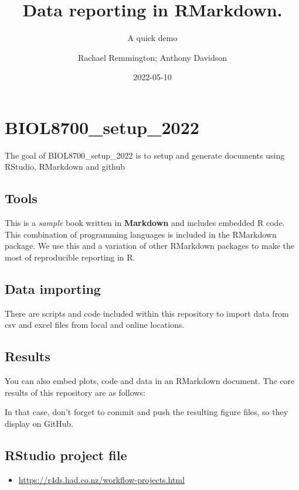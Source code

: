 \documentclass[
]{book}
\title{Data reporting in RMarkdown.}
\subtitle{A quick demo}
\author{Rachael Remmington; Anthony Davidson}
\date{2022-05-10}
\providecommand{\tightlist}{%
  \setlength{\itemsep}{0pt}\setlength{\parskip}{0pt}}
\begin{document}
\maketitle

{
\setcounter{tocdepth}{1}
\tableofcontents
}
\hypertarget{biol8700_setup_2022}{%
\chapter{BIOL8700\_setup\_2022}\label{biol8700_setup_2022}}

The goal of BIOL8700\_setup\_2022 is to setup and generate documents using RStudio, RMarkdown and github

\hypertarget{tools}{%
\section{Tools}\label{tools}}

This is a \emph{sample} book written in \textbf{Markdown} and includes embedded R code. This combination of programming languages is included in the RMarkdown package. We use this and a variation of other RMarkdown packages to make the most of reproducible reporting in R.

\hypertarget{data-importing}{%
\section{Data importing}\label{data-importing}}

There are scripts and code included within this repository to import data from csv and excel files from local and online locations.

\hypertarget{results}{%
\section{Results}\label{results}}

You can also embed plots, code and data in an RMarkdown document. The core results of this repository are as follows:

In that case, don't forget to commit and push the resulting figure files, so they display on GitHub.

\hypertarget{rstudio-project-file}{%
\section{RStudio project file}\label{rstudio-project-file}}

\begin{itemize}
\tightlist
\item
  \url{https://r4ds.had.co.nz/workflow-projects.html}
\end{itemize}
\end{document}
